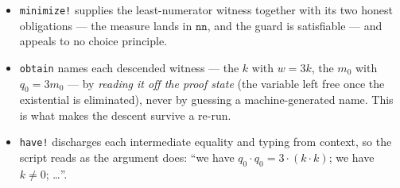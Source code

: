 \begin{itemize}
\item \texttt{minimize!} supplies the least-numerator witness together with its
  two honest obligations --- the measure lands in $\mathtt{nn}$, and the guard
  is satisfiable --- and appeals to no choice principle.
\item \texttt{obtain} names each descended witness --- the $k$ with $w = 3k$,
  the $m_0$ with $q_0 = 3m_0$ --- by \emph{reading it off the proof state} (the
  variable left free once the existential is eliminated), never by guessing a
  machine-generated name.  This is what makes the descent survive a re-run.
\item \texttt{have!} discharges each intermediate equality and typing from
  context, so the script reads as the argument does: ``we have
  $q_0\cdot q_0 = 3\cdot(k\cdot k)$; we have $k \neq 0$; \ldots''.
\end{itemize}

